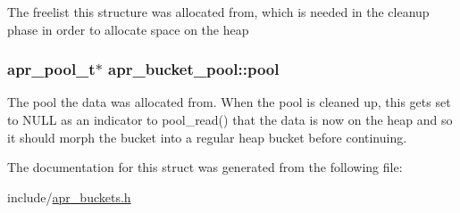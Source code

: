 The freelist this structure was allocated from, which is needed in the cleanup phase in order to allocate space on the heap \hypertarget{structapr__bucket__pool_af55591a1e7f3b097e7c271683bc80968}{
\subsubsection[{pool}]{\setlength{\rightskip}{0pt plus 5cm}apr\-\_\-pool\-\_\-t$\ast$ apr\-\_\-bucket\-\_\-pool\-::pool}}\label{structapr__bucket__pool_af55591a1e7f3b097e7c271683bc80968}
The pool the data was allocated from. When the pool is cleaned up, this gets set to N\-U\-L\-L as an indicator to pool\-\_\-read() that the data is now on the heap and so it should morph the bucket into a regular heap bucket before continuing. 

The documentation for this struct was generated from the following file\-:\begin{DoxyCompactItemize}
\item 
include/\hyperlink{apr__buckets_8h}{apr\-\_\-buckets.\-h}\end{DoxyCompactItemize}
